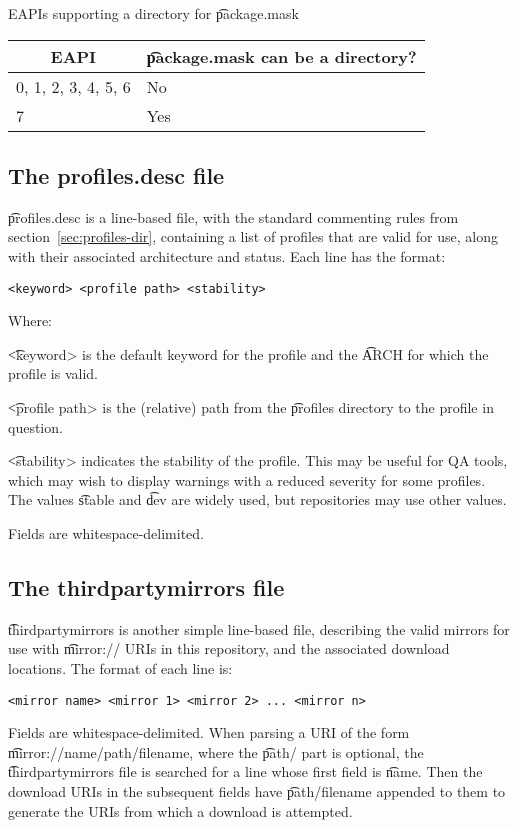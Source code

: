 \begin{centertable}{EAPIs supporting a directory for \t{package.mask}}
    \label{tab:package-mask-dir}
    \begin{tabular}{ll}
      \toprule
      \multicolumn{1}{c}{\textbf{EAPI}} &
      \multicolumn{1}{c}{\textbf{\t{package.mask} can be a directory?}} \\
      \midrule
      0, 1, 2, 3, 4, 5, 6 & No  \\
      7                   & Yes \\
      \bottomrule
    \end{tabular}
\end{centertable}

\subsection{The profiles.desc file}
\label{sec:profiles.desc}
\t{profiles.desc} is a line-based file, with the standard commenting
rules from section~\ref{sec:profiles-dir}, containing a list of profiles
that are valid for use, along with their associated architecture and
status. Each line has the format:

\begin{verbatim}
<keyword> <profile path> <stability>
\end{verbatim}

Where:
\nobreakpar
\begin{compactitem}
\item \t{<keyword>} is the default keyword for the profile and the \t{ARCH} for which the profile is
    valid.
\item \t{<profile path>} is the (relative) path from the \t{profiles} directory to the profile in
    question.
\item \t{<stability>} indicates the stability of the profile. This may be useful for QA tools, which
    may wish to display warnings with a reduced severity for some profiles. The values \t{stable}
    and \t{dev} are widely used, but repositories may use other values.
\end{compactitem}

Fields are whitespace-delimited.

\subsection{The thirdpartymirrors file}
\label{sec:thirdpartymirrors}
\t{thirdpartymirrors} is another simple line-based file, describing the valid mirrors for use with
\t{mirror://} URIs in this repository, and the associated download locations. The format of each
line is:
\begin{verbatim}
<mirror name> <mirror 1> <mirror 2> ... <mirror n>
\end{verbatim}
Fields are whitespace-delimited. When parsing a URI of the form
\t{mirror:/\slash name\slash path\slash filename},
where the \t{path/} part is optional, the \t{thirdpartymirrors} file is searched for a line whose
first field is \t{name}. Then the download URIs in the subsequent fields have
\t{path\slash filename} appended to them to generate the URIs from which a download is attempted.

